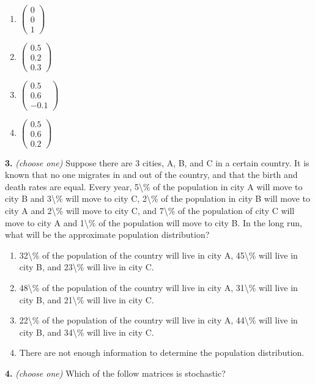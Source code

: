 \documentclass[10pt,a4paper]{article}
\begin{document}
\begin{enumerate}[label=(\Alph*)]
\item \(\begin{pmatrix}0\\0\\1\end{pmatrix}\)
\item \(\begin{pmatrix}0.5\\0.2\\0.3\end{pmatrix}\)
\item \(\begin{pmatrix}0.5\\0.6\\-0.1\end{pmatrix}\)
\item \(\begin{pmatrix}0.5\\0.6\\0.2\end{pmatrix}\)
\end{enumerate}
\smallskip
\textbf{3.} \textit{(choose one)} Suppose there are 3 cities, A, B, and C in a certain country. It is known that no one migrates in and out of the country, and that the birth and death rates are equal. Every year, 5\textbackslash{}\% of the population in city A will move to city B and 3\textbackslash{}\% will move to city C, 2\textbackslash{}\% of the population in city B will move to city A and 2\textbackslash{}\% will move to city C, and 7\textbackslash{}\% of the population of city C will move to city A and 1\textbackslash{}\% of the population will move to city B. In the long run, what will be the approximate population distribution?

\begin{enumerate}[label=(\Alph*)]
\item 32\textbackslash{}\% of the population of the country will live in city A, 45\textbackslash{}\% will live in city B, and 23\textbackslash{}\% will live in city C.
\item 48\textbackslash{}\% of the population of the country will live in city A, 31\textbackslash{}\% will live in city B, and 21\textbackslash{}\% will live in city C.
\item 22\textbackslash{}\% of the population of the country will live in city A, 44\textbackslash{}\% will live in city B, and 34\textbackslash{}\% will live in city C.
\item There are not enough information to determine the population distribution.
\end{enumerate}
\smallskip
\textbf{4.} \textit{(choose one)} Which of the follow matrices is stochastic?
\end{document}
